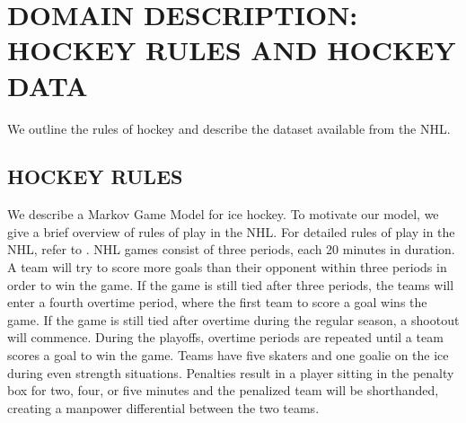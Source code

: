 \documentclass[]{article}
\begin{document}


\section{DOMAIN DESCRIPTION: HOCKEY RULES AND HOCKEY DATA}
\label{sec:background-notation}

We outline the rules of hockey and describe the dataset available from the NHL.

\subsection{HOCKEY RULES}
We describe a Markov Game Model for ice hockey. To motivate our model, we give a brief overview of rules of play in the NHL. For detailed rules of play in the NHL, refer to \citep{NHLRulebook2014}. NHL games consist of three periods, each 20 minutes in duration. A team will try to score more goals than their opponent within three periods in order to win the game. If the game is still tied after three periods, the teams will enter a fourth overtime period, where the first team to score a goal wins the game. If the game is still tied after overtime during the regular season, a shootout will commence. During the playoffs, overtime periods are repeated until a team scores a goal to win the game. Teams have five skaters and one goalie on the ice during even strength situations. Penalties result in a player sitting in the penalty box for two, four, or five minutes and the penalized team will be shorthanded, creating a manpower differential between the two teams.

\end{document}
